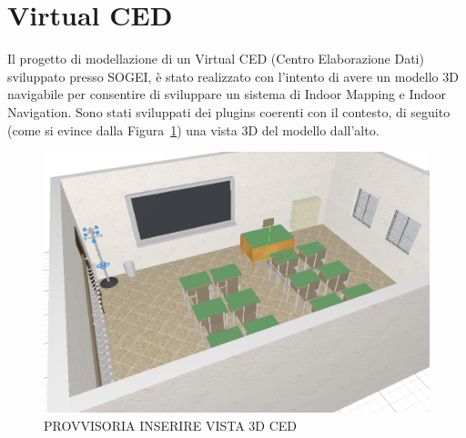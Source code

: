 \section{Virtual CED}
\label{sec:chapter_4_section_2}
Il progetto di modellazione di un Virtual CED (Centro Elaborazione Dati) sviluppato presso SOGEI, \`e stato realizzato con
l'intento di avere un modello 3D navigabile per consentire di sviluppare un sistema di Indoor Mapping e Indoor Navigation.
Sono stati sviluppati dei plugins coerenti con il contesto, di seguito (come si evince dalla Figura~\ref{fig:revit}) una
vista 3D del modello dall'alto.\\
\begin{figure}[htbp] %
   \centering
   \includegraphics[width=1\linewidth]{images/3d-school-2}
   \caption{PROVVISORIA INSERIRE VISTA 3D CED}
   \label{fig:revit}
   \end{figure}

